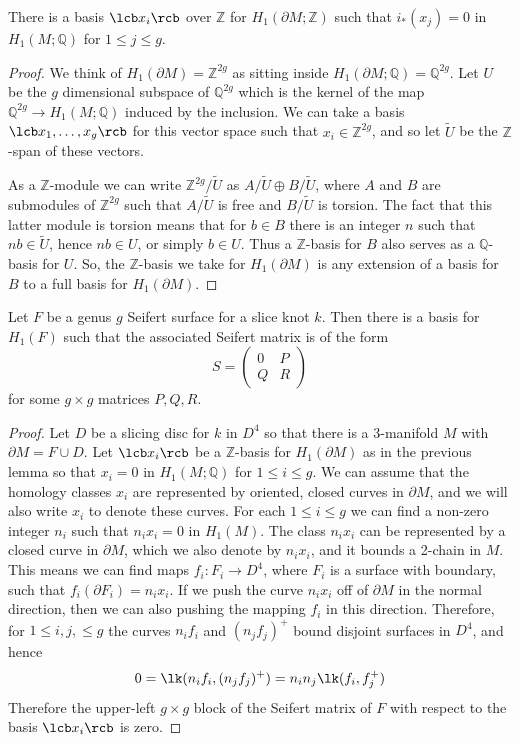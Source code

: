 \begin{lem}
There is a basis $\lcb x_i \rcb$ over $\mathbb Z$ for $H_1(\partial M;\mathbb Z)$ such that $i_*(x_j)=0$ in $H_1(M;\mathbb Q)$ for $1 \leq j \leq g$.
\end{lem}
\begin{proof}
We think of $H_1(\partial M) = \mathbb Z^{2g}$ as sitting inside $H_1(\partial M;\mathbb Q) = \mathbb Q^{2g}$. Let $U$ be the $g$ dimensional subspace of $\mathbb Q^{2g}$ which is the kernel of the map $\mathbb Q^{2g} \rightarrow H_1(M;\mathbb Q)$ induced by the inclusion. We can take a basis $\lcb x_1,\ldots,x_g \rcb$ for this vector space such that $x_i \in \mathbb Z^{2g}$, and so let $\widetilde{U}$ be the $\mathbb Z$-span of these vectors. 

As a $\mathbb Z$-module we can write $\mathbb Z^{2g} / \widetilde U$ as $A / \widetilde U \oplus B / \widetilde U$, where $A$ and $B$ are submodules of $\mathbb Z^{2g}$ such that $A / \widetilde U$ is free and $B / \widetilde U$ is torsion. The fact that this latter module is torsion means that for $b \in B$ there is an integer $n$ such that $nb \in \widetilde U$, hence $nb \in U$, or simply $b \in U$. Thus a $\mathbb Z$-basis for $B$ also serves as a $\mathbb Q$-basis for $U$. So, the $\mathbb Z$-basis we take for $H_1(\partial M)$ is any extension of a basis for $B$ to a full basis for $H_1(\partial M)$. 
\end{proof}

\begin{lem}
Let $F$ be a genus $g$ Seifert surface for a slice knot $k$. Then there is a basis for $H_1(F)$ such that the associated Seifert matrix is of the form
\[ S = \begin{pmatrix} 0 & P \\ Q & R \end{pmatrix} \]
for some $g \times g$ matrices $P,Q,R$.
\end{lem}
\begin{proof}
Let $D$ be a slicing disc for $k$ in $D^4$ so that there is a 3-manifold $M$ with $\partial M = F \cup D$. Let $\lcb x_i \rcb$ be a $\mathbb Z$-basis for $H_1(\partial M)$ as in the previous lemma so that $x_i=0$ in $H_1(M;\mathbb Q)$ for $1 \leq i \leq g$. We can assume that the homology classes $x_i$ are represented by oriented, closed curves in $\partial M$, and we will also write $x_i$ to denote these curves. For each $1 \leq i \leq g$ we can find a non-zero integer $n_i$ such that $n_i x_i = 0$ in $H_1(M)$. The class $n_i x_i$ can be represented by a closed curve in $\partial M$, which we also denote by $n_i x_i$, and it bounds a 2-chain in $M$. This means we can find maps $f_i : F_i \rightarrow D^4$, where $F_i$ is a surface with boundary, such that $f_i(\partial F_i) = n_i x_i$. If we push the curve $n_i x_i$ off of $\partial M$ in the normal direction, then we can also pushing the mapping $f_i$ in this direction. Therefore, for $1 \leq i,j, \leq g$ the curves $n_i f_i$ and $(n_j f_j)^+$ bound disjoint surfaces in $D^4$, and hence 
\[ 0 = \lk(n_if_i,(n_jf_j)^+) = n_in_j \lk(f_i,f_j^+) \]
Therefore the upper-left $g \times g$ block of the Seifert matrix of $F$ with respect to the basis $\lcb x_i \rcb$ is zero.
\end{proof}

